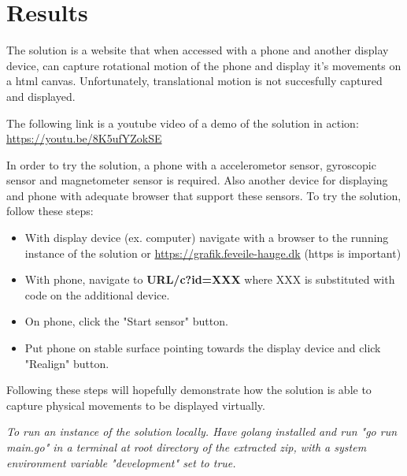 \newpage
\section{Results}
The solution is a website that when accessed with a phone and another display device, can capture rotational motion of the phone and display it's movements on a html canvas.
Unfortunately, translational motion is not succesfully captured and displayed.

The following link is a youtube video of a demo of the solution in action: \href{https://youtu.be/8K5ufYZokSE}{https://youtu.be/8K5ufYZokSE}  

In order to try the solution, a phone with a accelerometor sensor, gyroscopic sensor and magnetometer sensor is required.
Also another device for displaying and phone with adequate browser that support these sensors.
To try the solution, follow these steps:
\begin{itemize}
    \item With display device (ex. computer) navigate with a browser to the running instance of the solution or \href{https://grafik.feveile-hauge.dk}{https://grafik.feveile-hauge.dk} (https is important)
    \item With phone, navigate to \textbf{URL/c?id=XXX} where XXX is substituted with code on the additional device.
    \item On phone, click the "Start sensor" button.
    \item Put phone on stable surface pointing towards the display device and click "Realign" button. 
\end{itemize}

Following these steps will hopefully demonstrate how the solution is able to capture physical movements to be displayed virtually.

\textit{To run an instance of the solution locally. Have golang installed and run "go run main.go" in a terminal at root directory of the extracted zip, with a system environment variable "development" set to true. }
